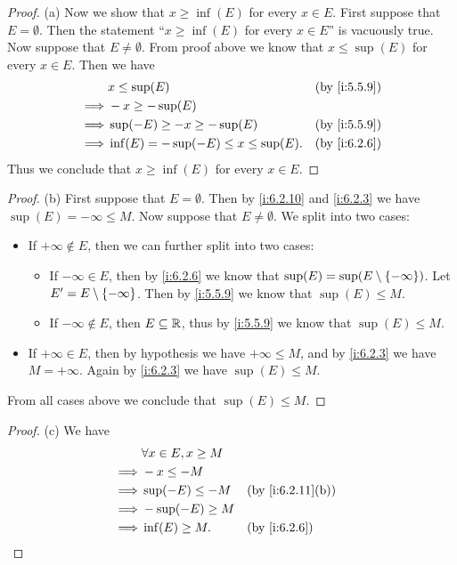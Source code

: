 \begin{proof}{(a)}
  Now we show that \(x \geq \inf(E)\) for every \(x \in E\).
  First suppose that \(E = \emptyset\).
  Then the statement ``\(x \geq \inf(E)\) for every \(x \in E\)'' is vacuously true.
  Now suppose that \(E \neq \emptyset\).
  From proof above we know that \(x \leq \sup(E)\) for every \(x \in E\).
  Then we have
  \begin{align*}
             & x \leq \sup(E)                           &  & \by{i:5.5.9} \\
    \implies & -x \geq -\sup(E)                                           \\
    \implies & \sup(-E) \geq -x \geq -\sup(E)           &  & \by{i:5.5.9} \\
    \implies & \inf(E) = -\sup(-E) \leq x \leq \sup(E). &  & \by{i:6.2.6}
  \end{align*}
  Thus we conclude that \(x \geq \inf(E)\) for every \(x \in E\).
\end{proof}

\begin{proof}{(b)}
  First suppose that \(E = \emptyset\).
  Then by \cref{i:6.2.10} and \cref{i:6.2.3} we have \(\sup(E) = -\infty \leq M\).
  Now suppose that \(E \neq \emptyset\).
  We split into two cases:
  \begin{itemize}
    \item If \(+\infty \not\in E\), then we can further split into two cases:
          \begin{itemize}
            \item If \(-\infty \in E\), then by \cref{i:6.2.6} we know that \(\sup(E) = \sup(E \setminus \left\lbrace-\infty\right\rbrace)\).
                  Let \(E' = E \setminus \left\lbrace-\infty\right\rbrace\).
                  Then by \cref{i:5.5.9} we know that \(\sup(E) \leq M\).
            \item If \(-\infty \notin E\), then \(E \subseteq \mathbb{R}\), thus by \cref{i:5.5.9} we know that \(\sup(E) \leq M\).
          \end{itemize}
    \item If \(+\infty \in E\), then by hypothesis we have \(+\infty \leq M\), and by \cref{i:6.2.3} we have \(M = +\infty\).
          Again by \cref{i:6.2.3} we have \(\sup(E) \leq M\).
  \end{itemize}
  From all cases above we conclude that \(\sup(E) \leq M\).
\end{proof}

\begin{proof}{(c)}
  We have
  \begin{align*}
             & \forall x \in E, x \geq M                       \\
    \implies & -x \leq -M                                      \\
    \implies & \sup(-E) \leq -M          &  & \by{i:6.2.11}[b] \\
    \implies & -\sup(-E) \geq M                                \\
    \implies & \inf(E) \geq M.           &  & \by{i:6.2.6}
  \end{align*}
\end{proof}


